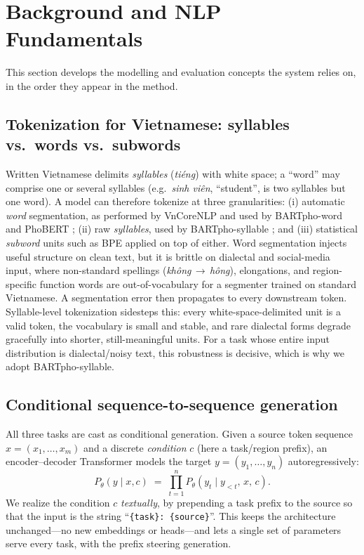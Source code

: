 \documentclass[11pt]{article}
\begin{document}
\section{Background and NLP Fundamentals}
\label{sec:background}

This section develops the modelling and evaluation concepts the system relies
on, in the order they appear in the method.

\subsection{Tokenization for Vietnamese: syllables vs.\ words vs.\ subwords}
\label{sec:bg-tok}

Written Vietnamese delimits \emph{syllables} (\emph{ti\'{e}ng}) with white space;
a ``word'' may comprise one or several syllables (e.g.\ \emph{sinh vi\^{e}n},
``student'', is two syllables but one word). A model can therefore tokenize at
three granularities: (i) automatic \emph{word} segmentation, as performed by
VnCoreNLP \citep{vu2018vncorenlp} and used by BARTpho-word and PhoBERT
\citep{nguyen2020phobert}; (ii) raw \emph{syllables}, used by BARTpho-syllable
\citep{tran2022bartpho}; and (iii) statistical \emph{subword} units such as BPE
\citep{sennrich2016bpe} applied on top of either. Word segmentation injects
useful structure on clean text, but it is brittle on dialectal and social-media
input, where non-standard spellings (\emph{kh\^{o}ng}\,$\to$\,\emph{h\^{o}ng}),
elongations, and region-specific function words are out-of-vocabulary for a
segmenter trained on standard Vietnamese. A segmentation error then propagates to
every downstream token. Syllable-level tokenization sidesteps this: every
white-space-delimited unit is a valid token, the vocabulary is small and stable,
and rare dialectal forms degrade gracefully into shorter, still-meaningful units.
For a task whose entire input distribution is dialectal/noisy text, this
robustness is decisive, which is why we adopt BARTpho-syllable.

\subsection{Conditional sequence-to-sequence generation}
\label{sec:bg-seq2seq}

All three tasks are cast as conditional generation. Given a source token sequence
$x = (x_1,\dots,x_m)$ and a discrete \emph{condition} $c$ (here a task/region
prefix), an encoder--decoder Transformer \citep{vaswani2017attention} models the
target $y = (y_1,\dots,y_n)$ autoregressively:
\begin{equation}
  P_\theta(y \mid x, c) \;=\; \prod_{t=1}^{n} P_\theta\!\left(y_t \mid y_{<t},\, x,\, c\right).
  \label{eq:seq2seq}
\end{equation}
We realize the condition $c$ \emph{textually}, by prepending a task prefix to the
source so that the input is the string ``\texttt{\{task\}: \{source\}}''. This
keeps the architecture unchanged---no new embeddings or heads---and lets a single
set of parameters serve every task, with the prefix steering generation.
\end{document}
